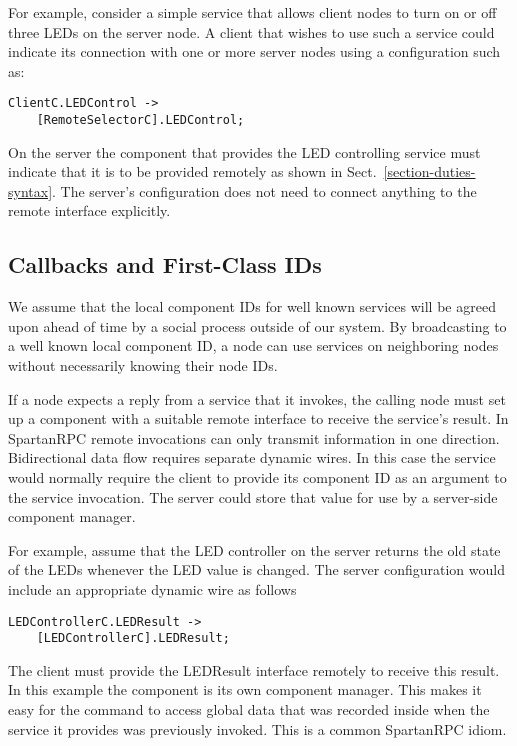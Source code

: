 For example, consider a simple service that allows client nodes to turn on or off three LEDs on
the server node. A client that wishes to use such a service could indicate its connection with
one or more server nodes using a configuration such as:
\begin{Verbatim}
ClientC.LEDControl ->
    [RemoteSelectorC].LEDControl;
\end{Verbatim}
\vspace{0.4em}

On the server the component that provides the LED controlling service must indicate that it is
to be provided remotely as shown in Sect.~\ref{section-duties-syntax}. The server's
configuration does not need to connect anything to the remote interface explicitly.

\subsection{Callbacks and First-Class IDs}

We assume that the local component IDs for well known services will be agreed upon ahead of time
by a social process outside of our system. By broadcasting to a well known local component ID, a
node can use services on neighboring nodes without necessarily knowing their node IDs.

If a node expects a reply from a service that it invokes, the calling node must set up a
component with a suitable remote interface to receive the service's result. In SpartanRPC remote
invocations can only transmit information in one direction. Bidirectional data flow requires
separate dynamic wires. In this case the service would normally require the client to provide
its component ID as an argument to the service invocation. The server could store that value for
use by a server-side component manager.

For example, assume that the LED controller on the server returns the old state of the LEDs
whenever the LED value is changed. The server configuration would include an appropriate dynamic
wire as follows
\begin{Verbatim}
LEDControllerC.LEDResult ->
    [LEDControllerC].LEDResult;
\end{Verbatim}

The client must provide the LEDResult interface remotely to receive this result. In this example
the  component is its own component manager. This makes it easy for the
 command to access global data that was recorded inside 
when the service it provides was previously invoked. This is a common SpartanRPC idiom.
